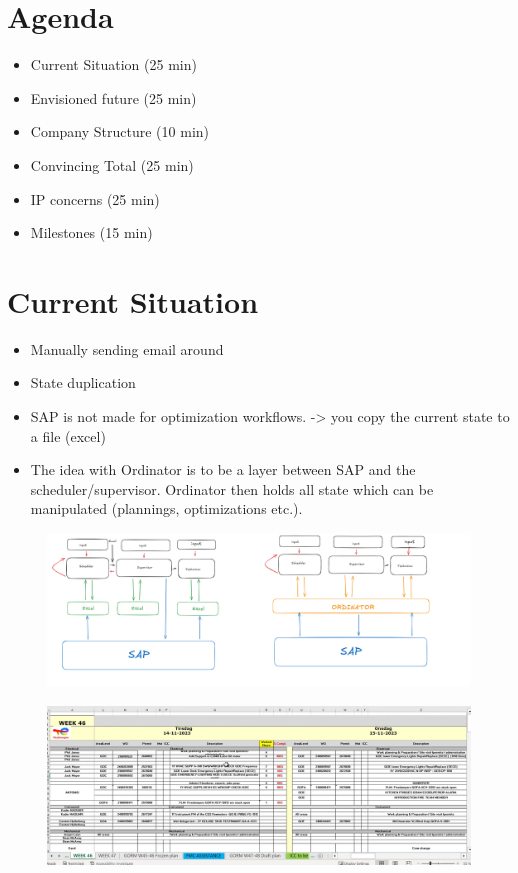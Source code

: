 \documentclass{article}
\begin{document}
\section{Agenda}
\begin{itemize}
	\item Current Situation    (25 min)
        \item Envisioned future    (25 min)
        \item Company Structure    (10 min)
        \item Convincing Total     (25 min)	
        \item IP concerns          (25 min)
        \item Milestones           (15 min)
\end{itemize}

\section{Current Situation}


\begin{itemize}
    \item Manually sending email around
    \item State duplication
    \item SAP is not made for optimization workflows. -> you copy the current state to a file (excel)
    \item The idea with Ordinator is to be a layer between SAP and the scheduler/supervisor. Ordinator then holds all state which can be manipulated (plannings, optimizations etc.).
\end{itemize}
\begin{figure}
    \includegraphics[width=1.0\textwidth]{project-plans/scipo-total/figures/scheduling-as-is-to-be.png}

\end{figure}
\begin{figure}
\includegraphics[width=1.0\textwidth]{project-plans/scipo-total/figures/technician-excel.png}
\end{figure}
\end{document}
